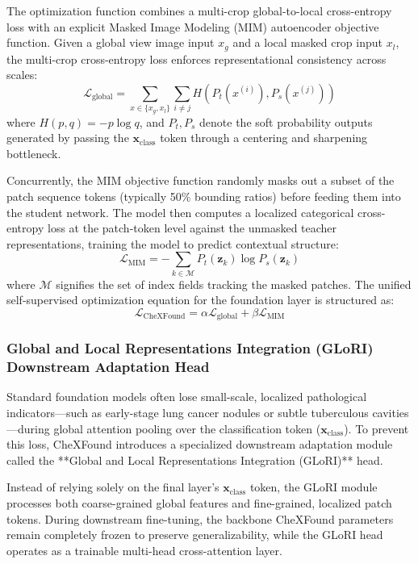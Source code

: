 The optimization function combines a multi-crop global-to-local cross-entropy loss with an explicit Masked Image Modeling (MIM) autoencoder objective function. Given a global view image input $x_g$ and a local masked crop input $x_l$, the multi-crop cross-entropy loss enforces representational consistency across scales:
\begin{equation}
	\mathcal{L}_{\text{global}} = \sum_{x \in \{x_g, x_l\}} \sum_{i \neq j} H\left(P_t(x^{(i)}), P_s(x^{(j)})\right)
\end{equation}
where $H(p, q) = -p \log q$, and $P_t, P_s$ denote the soft probability outputs generated by passing the $\mathbf{x}_{\text{class}}$ token through a centering and sharpening bottleneck.

Concurrently, the MIM objective function randomly masks out a subset of the patch sequence tokens (typically 50\% bounding ratios) before feeding them into the student network. The model then computes a localized categorical cross-entropy loss at the patch-token level against the unmasked teacher representations, training the model to predict contextual structure:
\begin{equation}
	\mathcal{L}_{\text{MIM}} = -\sum_{k \in \mathcal{M}} P_t(\mathbf{z}_k) \log P_s(\mathbf{z}_k)
\end{equation}
where $\mathcal{M}$ signifies the set of index fields tracking the masked patches. The unified self-supervised optimization equation for the foundation layer is structured as:
\begin{equation}
	\mathcal{L}_{\text{CheXFound}} = \alpha \mathcal{L}_{\text{global}} + \beta \mathcal{L}_{\text{MIM}}
\end{equation}

\subsubsection{Global and Local Representations Integration (GLoRI) Downstream Adaptation Head}

Standard foundation models often lose small-scale, localized pathological indicators—such as early-stage lung cancer nodules or subtle tuberculous cavities—during global attention pooling over the classification token ($\mathbf{x}_{\text{class}}$). To prevent this loss, CheXFound introduces a specialized downstream adaptation module called the **Global and Local Representations Integration (GLoRI)** head. 

Instead of relying solely on the final layer's $\mathbf{x}_{\text{class}}$ token, the GLoRI module processes both coarse-grained global features and fine-grained, localized patch tokens. During downstream fine-tuning, the backbone CheXFound parameters remain completely frozen to preserve generalizability, while the GLoRI head operates as a trainable multi-head cross-attention layer.

